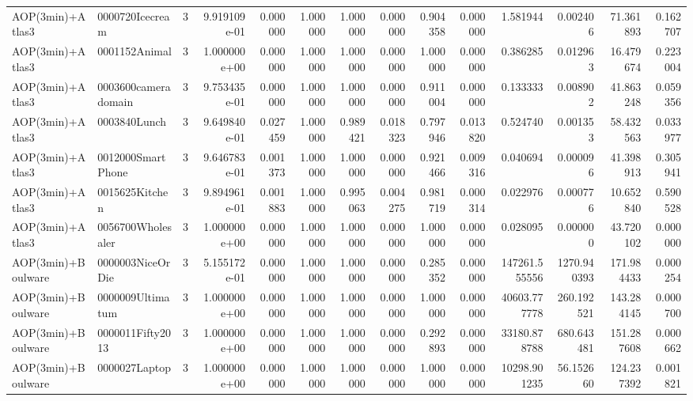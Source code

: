 \begin{tabular}{llrr|r|rr|rr|rr|rrr}
         AOP(3min)+Atlas3 &        0000720Icecream &       3 & 9.919109e-01 & 0.000000 & 1.000000 &      1.000000 & 0.000000 &      0.904358 & 0.000000 &      1.581944 &    0.002406 &    71.361893 &    0.162707 \\
         AOP(3min)+Atlas3 &          0001152Animal &       3 & 1.000000e+00 & 0.000000 & 1.000000 &      1.000000 & 0.000000 &      1.000000 & 0.000000 &      0.386285 &    0.012963 &    16.479674 &    0.223004 \\
         AOP(3min)+Atlas3 &    0003600cameradomain &       3 & 9.753435e-01 & 0.000000 & 1.000000 &      1.000000 & 0.000000 &      0.911004 & 0.000000 &      0.133333 &    0.008902 &    41.863248 &    0.059356 \\
         AOP(3min)+Atlas3 &           0003840Lunch &       3 & 9.649840e-01 & 0.027459 & 1.000000 &      0.989421 & 0.018323 &      0.797946 & 0.013820 &      0.524740 &    0.001353 &    58.432563 &    0.033977 \\
         AOP(3min)+Atlas3 &      0012000SmartPhone &       3 & 9.646783e-01 & 0.001373 & 1.000000 &      1.000000 & 0.000000 &      0.921466 & 0.009316 &      0.040694 &    0.000096 &    41.398913 &    0.305941 \\
         AOP(3min)+Atlas3 &         0015625Kitchen &       3 & 9.894961e-01 & 0.001883 & 1.000000 &      0.995063 & 0.004275 &      0.981719 & 0.000314 &      0.022976 &    0.000776 &    10.652840 &    0.590528 \\
         AOP(3min)+Atlas3 &      0056700Wholesaler &       3 & 1.000000e+00 & 0.000000 & 1.000000 &      1.000000 & 0.000000 &      1.000000 & 0.000000 &      0.028095 &    0.000000 &    43.720102 &    0.000000 \\
       AOP(3min)+Boulware &       0000003NiceOrDie &       3 & 5.155172e-01 & 0.000000 & 1.000000 &      1.000000 & 0.000000 &      0.285352 & 0.000000 & 147261.555556 & 1270.940393 &   171.984433 &    0.000254 \\
       AOP(3min)+Boulware &       0000009Ultimatum &       3 & 1.000000e+00 & 0.000000 & 1.000000 &      1.000000 & 0.000000 &      1.000000 & 0.000000 &  40603.777778 &  260.192521 &   143.284145 &    0.000700 \\
       AOP(3min)+Boulware &       0000011Fifty2013 &       3 & 1.000000e+00 & 0.000000 & 1.000000 &      1.000000 & 0.000000 &      0.292893 & 0.000000 &  33180.878788 &  680.643481 &   151.287608 &    0.000662 \\
       AOP(3min)+Boulware &          0000027Laptop &       3 & 1.000000e+00 & 0.000000 & 1.000000 &      1.000000 & 0.000000 &      1.000000 & 0.000000 &  10298.901235 &   56.152660 &   124.237392 &    0.001821 \\

\end{tabular}
